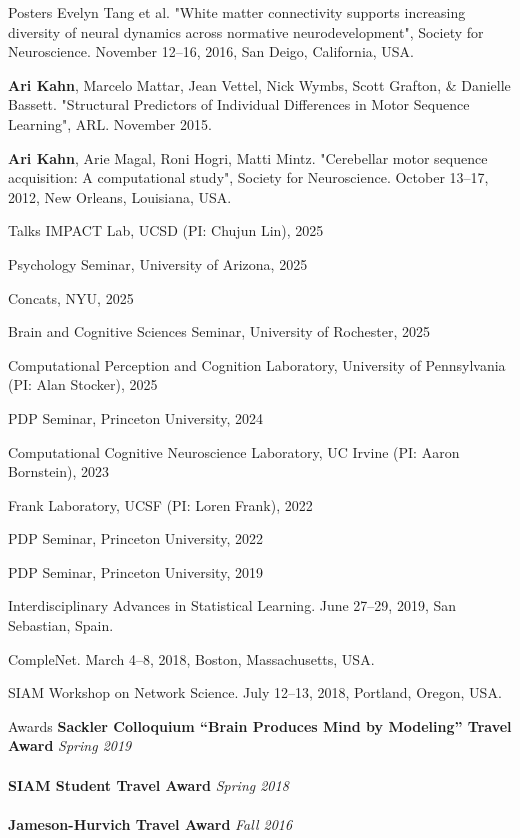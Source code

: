 \documentclass{resume} %
\begin{document}
\begin{rSection}{Posters}
Evelyn Tang et al. "White matter connectivity supports increasing diversity of neural dynamics across normative neurodevelopment", Society for Neuroscience. November 12--16, 2016, San Deigo, California, USA.

\textbf{Ari Kahn}, Marcelo Mattar, Jean Vettel, Nick Wymbs, Scott Grafton, \& Danielle Bassett. "Structural Predictors of Individual Differences in Motor Sequence Learning", ARL. November 2015.

\textbf{Ari Kahn}, Arie Magal, Roni Hogri, Matti Mintz. "Cerebellar motor sequence acquisition: A computational study", Society for Neuroscience. October 13--17, 2012, New Orleans, Louisiana, USA.
\end{rSection}

\begin{rSection}{Talks}
IMPACT Lab, UCSD (PI: Chujun Lin), 2025

Psychology Seminar, University of Arizona, 2025

Concats, NYU, 2025

Brain and Cognitive Sciences Seminar, University of Rochester, 2025

Computational Perception and Cognition Laboratory, University of Pennsylvania (PI: Alan Stocker), 2025

PDP Seminar, Princeton University, 2024

Computational Cognitive Neuroscience Laboratory, UC Irvine (PI: Aaron Bornstein), 2023

Frank Laboratory, UCSF (PI: Loren Frank), 2022

PDP Seminar, Princeton University, 2022

PDP Seminar, Princeton University, 2019

Interdisciplinary Advances in Statistical Learning. June 27--29, 2019, San Sebastian, Spain.

CompleNet. March 4--8, 2018, Boston, Massachusetts, USA.

SIAM Workshop on Network Science. July 12--13, 2018, Portland, Oregon, USA.
\end{rSection}

\begin{rSection}{Awards}
    \textbf{Sackler Colloquium ``Brain Produces Mind by Modeling'' Travel Award} \hfill \emph{Spring 2019} \\
    \\
    \textbf{SIAM Student Travel Award} \hfill \emph{Spring 2018} \\
    \\
    \textbf{Jameson-Hurvich Travel Award} \hfill \emph{Fall 2016} \\
\end{rSection}
\end{document}
